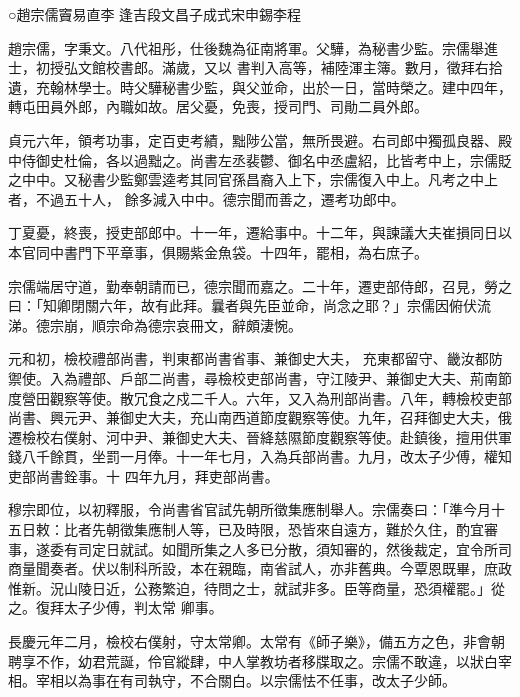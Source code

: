 
\begin{pinyinscope}

 ○趙宗儒竇易直李
 逢吉段文昌子成式宋申錫李程



 趙宗儒，字秉文。八代祖彤，仕後魏為征南將軍。父驊，為秘書少監。宗儒舉進士，初授弘文館校書郎。滿歲，又以
 書判入高等，補陸渾主簿。數月，徵拜右拾遺，充翰林學士。時父驊秘書少監，與父並命，出於一日，當時榮之。建中四年，轉屯田員外郎，內職如故。居父憂，免喪，授司門、司勛二員外郎。



 貞元六年，領考功事，定百吏考績，黜陟公當，無所畏避。右司郎中獨孤良器、殿中侍御史杜倫，各以過黜之。尚書左丞裴鬱、御名中丞盧紹，比皆考中上，宗儒貶之中中。又秘書少監鄭雲逵考其同官孫昌裔入上下，宗儒復入中上。凡考之中上者，不過五十人，
 餘多減入中中。德宗聞而善之，遷考功郎中。



 丁夏憂，終喪，授吏部郎中。十一年，遷給事中。十二年，與諫議大夫崔損同日以本官同中書門下平章事，俱賜紫金魚袋。十四年，罷相，為右庶子。



 宗儒端居守道，勤奉朝請而已，德宗聞而嘉之。二十年，遷吏部侍郎，召見，勞之曰：「知卿閉關六年，故有此拜。曩者與先臣並命，尚念之耶？」宗儒因俯伏流涕。德宗崩，順宗命為德宗哀冊文，辭頗淒惋。



 元和初，檢校禮部尚書，判東都尚書省事、兼御史大夫，
 充東都留守、畿汝都防禦使。入為禮部、戶部二尚書，尋檢校吏部尚書，守江陵尹、兼御史大夫、荊南節度營田觀察等使。散冗食之戍二千人。六年，又入為刑部尚書。八年，轉檢校吏部尚書、興元尹、兼御史大夫，充山南西道節度觀察等使。九年，召拜御史大夫，俄遷檢校右僕射、河中尹、兼御史大夫、晉絳慈隰節度觀察等使。赴鎮後，擅用供軍錢八千餘貫，坐罰一月俸。十一年七月，入為兵部尚書。九月，改太子少傅，權知吏部尚書銓事。十
 四年九月，拜吏部尚書。



 穆宗即位，以初釋服，令尚書省官試先朝所徵集應制舉人。宗儒奏曰：「準今月十五日敕：比者先朝徵集應制人等，已及時限，恐皆來自遠方，難於久住，酌宜審事，遂委有司定日就試。如聞所集之人多已分散，須知審的，然後裁定，宜令所司商量聞奏者。伏以制科所設，本在親臨，南省試人，亦非舊典。今覃恩既畢，庶政惟新。況山陵日近，公務繁迫，待問之士，就試非多。臣等商量，恐須權罷。」從之。復拜太子少傅，判太常
 卿事。



 長慶元年二月，檢校右僕射，守太常卿。太常有《師子樂》，備五方之色，非會朝聘享不作，幼君荒誕，伶官縱肆，中人掌教坊者移牒取之。宗儒不敢違，以狀白宰相。宰相以為事在有司執守，不合關白。以宗儒怯不任事，改太子少師。




\end{pinyinscope}
